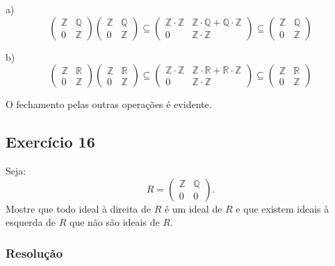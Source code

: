 \documentclass[10pt,a4paper]{article}
\begin{document}
a)
\[
\begin{pmatrix}
\mathbb{Z}&\mathbb{Q}\\0&\mathbb{Z}
\end{pmatrix}\begin{pmatrix}
\mathbb{Z}&\mathbb{Q}\\0&\mathbb{Z}
\end{pmatrix}\subseteq\begin{pmatrix}
\mathbb{Z}\cdot\mathbb{Z}&\mathbb{Z}\cdot\mathbb{Q}+\mathbb{Q}\cdot\mathbb{Z}\\0&\mathbb{Z}\cdot\mathbb{Z}
\end{pmatrix}\subseteq\begin{pmatrix}
\mathbb{Z}&\mathbb{Q}\\0&\mathbb{Z}
\end{pmatrix}
\]

\noindent
b)
\[
\begin{pmatrix}
\mathbb{Z}&\mathbb{R}\\0&\mathbb{Z}
\end{pmatrix}\begin{pmatrix}
\mathbb{Z}&\mathbb{R}\\0&\mathbb{Z}
\end{pmatrix}\subseteq\begin{pmatrix}
\mathbb{Z}\cdot\mathbb{Z}&\mathbb{Z}\cdot\mathbb{R}+\mathbb{R}\cdot\mathbb{Z}\\0&\mathbb{Z}\cdot\mathbb{Z}
\end{pmatrix}\subseteq\begin{pmatrix}
\mathbb{Z}&\mathbb{R}\\0&\mathbb{Z}
\end{pmatrix}
\]

\noindent
O fechamento pelas outras operações é evidente.

\subsection*{Exercício 16}

Seja:
\[
R=\begin{pmatrix}
\mathbb{Z}&\mathbb{Q}\\0&0
\end{pmatrix}.
\]
Mostre que todo ideal à direita de $R$ é um ideal de $R$ e que existem ideais à esquerda de $R$ que não são ideais de $R$.

\subsubsection*{Resolução}
\end{document}
